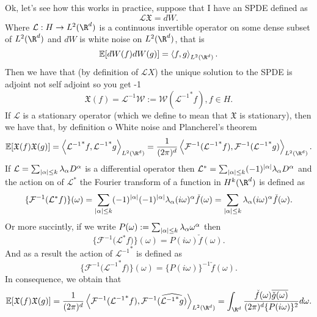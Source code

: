 \documentclass[12pt]{article}
\newcommand{\red}[1]{{\color{red}#1}}
\newcommand{\Ww}{\mathcal{W}}\newcommand{\Aa}{\mathcal{A}}\newcommand{\Bb}{\mathcal{B}}\newcommand{\Cc}{\mathcal{C}}\newcommand{\Ee}{\mathcal{E}}\newcommand{\Ff}{\mathcal{F}}\newcommand{\Gg}{\mathcal{G}}\newcommand{\Hh}{\mathcal{H}}\newcommand{\Kk}{\mathcal{K}}\newcommand{\Ll}{\mathcal{L}}\newcommand{\Mm}{\mathcal{M}}\newcommand{\Nn}{\mathcal{N}}\newcommand{\Pp}{\mathcal{P}}\newcommand{\Qq}{\mathcal{Q}}\newcommand{\Rr}{{\mathcal R}}\newcommand{\Ss}{{\mathcal S}}\newcommand{\Tt}{{\mathcal T}}\newcommand{\Zz}{{\mathcal Z}}\newcommand{\Uu}{{\mathcal U}}
\newcommand{\br}[1]{\left\langle#1\right\rangle}
\begin{document}
\begin{CJK*}{UTF8}{gbsn}
	Ok, let's see how this works in practice, suppose that I have an SPDE defined as
	\begin{equation*}
		\Ll\mathfrak{X}=dW.
	\end{equation*}
	Where $\Ll:H\to L^2(\R^d)$ is a continuous invertible operator on some dense subset of $L^2(\R^d)$ and $dW$ is white noise on  $L^2(\R^d)$, that is
	\begin{equation*}
		\E[dW(f)dW(g)]=\br{f,g}_{L^2(\R^d)}.
	\end{equation*}
	Then we have that (by definition of $\Ll X$)   the unique solution to the SPDE is \red{adjoint not self adjoint so you get -1}
	\begin{equation*}
		\mathfrak{X}(f)=\mathcal{L}^{-1}\Ww:=\Ww({\Ll^{-1}}^*f), f\in H.
	\end{equation*}
	If $\Ll$ is a stationary operator (which we define to mean that $\mathfrak{X}$ is stationary), then we have that, by definition o White noise and Plancherel's theorem
	\begin{equation*}
		\E[\mathfrak{X}(f)\mathfrak{X}(g)]=\br{{\Ll^{-1}}^*f,{\Ll^{-1}}^*g}_{L^2(\R^d)}=\frac{1}{(2\pi)^d}\br{\mathcal{F}^{-1}({{\Ll^{-1}}^* f)},\mathcal{F}^{-1}({{\Ll^{-1}}^* g)}}_{L^2(\R^d)}.
	\end{equation*}
	If $\Ll=\sum _{\abs{\alpha}\leq k} \lambda _\alpha D^\alpha $ is a differential operator then $\Ll^*=\sum _{\abs{\alpha}\leq k} (-1)^\abs{\alpha}\lambda _\alpha D^\alpha $ and the action on of $\mathcal{L}^*$ the Fourier transform of a function in $H^k(\R^d)$ is defined as
	\begin{equation*}
		\{\mathcal{F}^{-1}({\Ll^* f)}\}(\omega)= \sum _{\abs{\alpha}\leq k}(-1)^\abs{\alpha}(-1)^\abs{\alpha} \lambda _\alpha (i\omega)^\alpha \check{f}(\omega)=\sum _{\abs{\alpha}\leq k}\lambda _\alpha (i\omega)^\alpha \check{f}(\omega).
	\end{equation*}
	Or more succintly, if we write $P(\omega):=\sum _{\abs{\alpha}\leq k}\lambda _\alpha \omega^\alpha$ then
	\begin{equation*}
		\{\mathcal{F}^{-1}({\Ll^* f)}\}(\omega)=P(i\omega)\check{f}(\omega).
	\end{equation*}
	And as a result the action of ${\Ll^{-1}}^*$ is defined as
	\begin{equation*}
		\{\mathcal{F}^{-1}({{\Ll^{-1}}^* f)}\}(\omega)= \{P(i\omega)\}^{-1}\check{f}(\omega).
	\end{equation*}
	In consequence, we obtain that
	\begin{equation*}
		\E[\mathfrak{X}(f)\mathfrak{X}(g)]=\frac{1}{(2\pi)^d}\br{\mathcal{F}^{-1}({{\Ll^{-1}}^*f}),\mathcal{F}^{-1}({\widehat{{\Ll^{-1}}^*g}})}_{L^2(\R^d)}=\int_{\R^d}\frac{\check{f}(\omega)\overline{\check{g}(\omega)}}{(2\pi)^d\{P(i\omega)\}^{2}} d\omega.

\end{equation*}
\end{CJK*}
\end{document}
